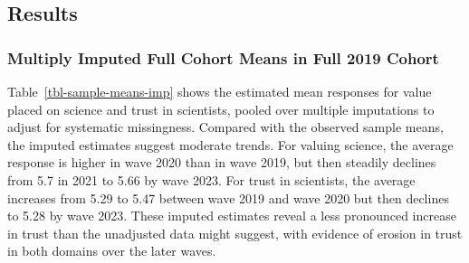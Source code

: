 \documentclass[
  single column]{article}
\begin{document}
\newpage{}

\subsection{Results}\label{results}

\subsubsection{Multiply Imputed Full Cohort Means in Full 2019
Cohort}\label{multiply-imputed-full-cohort-means-in-full-2019-cohort}

Table~\ref{tbl-sample-means-imp} shows the estimated mean responses for
value placed on science and trust in scientists, pooled over multiple
imputations to adjust for systematic missingness. Compared with the
observed sample means, the imputed estimates suggest moderate trends.
For valuing science, the average response is higher in wave 2020 than in
wave 2019, but then steadily declines from 5.7 in 2021 to 5.66 by wave
2023. For trust in scientists, the average increases from 5.29 to 5.47
between wave 2019 and wave 2020 but then declines to 5.28 by wave 2023.
These imputed estimates reveal a less pronounced increase in trust than
the unadjusted data might suggest, with evidence of erosion in trust in
both domains over the later waves.
\end{document}
